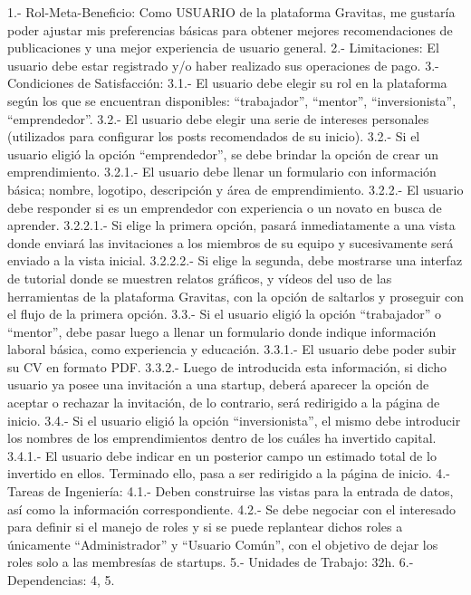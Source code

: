 	1.-	Rol-Meta-Beneficio: 	Como USUARIO de la plataforma Gravitas, me gustaría poder ajustar mis preferencias básicas para obtener mejores recomendaciones de publicaciones y una mejor experiencia de usuario general.
	2.-	Limitaciones: El usuario debe estar registrado y/o haber realizado sus operaciones de pago.
	3.-	Condiciones de Satisfacción:
		3.1.-	El usuario debe elegir su rol en la plataforma según los que se encuentran disponibles: “trabajador”, “mentor”, “inversionista”, “emprendedor”.
		3.2.-	El usuario debe elegir una serie de intereses personales (utilizados para configurar los posts recomendados de su inicio).
		3.2.-	Si el usuario eligió la opción “emprendedor”, se debe brindar la opción de crear un emprendimiento.
			3.2.1.-	El usuario debe llenar un formulario con información básica; nombre, logotipo, descripción y área de emprendimiento.
			3.2.2.-	El usuario debe responder si es un emprendedor con experiencia o un novato en busca de aprender.
				3.2.2.1.-	Si elige la primera opción, pasará inmediatamente a una vista donde enviará las invitaciones a los miembros de su equipo y sucesivamente será enviado a la vista inicial.
				3.2.2.2.-	Si elige la segunda, debe mostrarse una interfaz de tutorial donde se muestren relatos gráficos, y vídeos del uso de las herramientas de la plataforma Gravitas, con la opción de saltarlos y proseguir con el flujo de la primera opción.
		3.3.-	Si el usuario eligió la opción “trabajador” o “mentor”, debe pasar luego a llenar un formulario donde indique información laboral básica, como experiencia y educación.
			3.3.1.- El usuario debe poder subir su CV en formato PDF.
			3.3.2.-	Luego de introducida esta información, si dicho usuario ya posee una invitación a una startup, deberá aparecer la opción de aceptar o rechazar la invitación, de lo contrario, será redirigido a la página de inicio.
		3.4.-	Si el usuario eligió la opción “inversionista”, el mismo debe introducir los nombres de los emprendimientos dentro de los cuáles ha invertido capital.
			3.4.1.- El usuario debe indicar en un posterior campo un estimado total de lo invertido en ellos. Terminado ello, pasa a ser redirigido a la página de inicio.
	4.-	Tareas de Ingeniería:
		4.1.- Deben construirse las vistas para la entrada de datos, así como la información correspondiente.
		4.2.- Se debe negociar con el interesado para definir si el manejo de roles y si se puede replantear dichos roles a únicamente “Administrador” y “Usuario Común”, con el objetivo de dejar los roles solo a las membresías de startups.
	5.-	Unidades de Trabajo: 32h.
	6.-	Dependencias: 4, 5.

